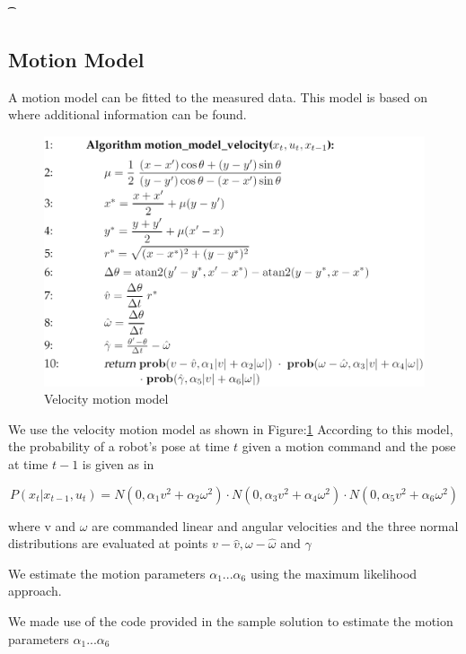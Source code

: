 \documentclass[10pt]{scrartcl}
\begin{document}
\newpage

\hl{\t}

\subsection{Motion Model}

A motion model can be fitted to the measured data. This model is based on \cite{MotionModel} where additional information can be found.

\begin{figure}[H]
\centering
\includegraphics[scale=0.2]{images/velocity-motion-model}
\caption{Velocity motion model \cite{MotionModel}}
\label{fig:motionmodel}
\end{figure}

We use the velocity motion model as shown in Figure:\ref{fig:motionmodel} According to this model, the probability of a robot’s pose at time $t$ given a motion command and the pose at time $t − 1$ is given as in \cite{Alex}

\[
	P(x_t|x_{t-1},u_t) = N(0,\alpha_1 v^2+\alpha_2 \omega^2) \cdot
						 N(0,\alpha_3 v^2+\alpha_4 \omega^2) \cdot
						 N(0,\alpha_5 v^2+\alpha_6 \omega^2)
\]

where v and $\omega$ are commanded linear and angular velocities and the three normal distributions are evaluated at points 
$v - \hat{v} , \omega - \hat{\omega} $ and $\gamma$


We estimate the motion parameters $\alpha_1 ... \alpha_6$ using the maximum likelihood approach.

We made use of the code provided in the sample solution \cite{Alex} to estimate the  motion parameters $\alpha_1 ... \alpha_6$
\end{document}
